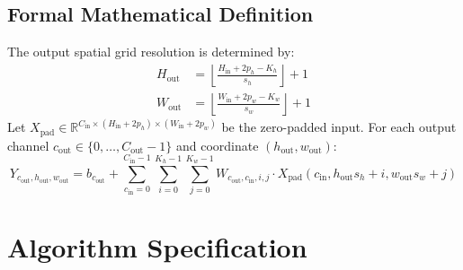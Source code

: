 \documentclass[11pt,a4paper]{article}
\theoremstyle{definition}
\begin{document}
\subsection{Formal Mathematical Definition}
The output spatial grid resolution is determined by:
\begin{align}
H_{\text{out}} &= \left\lfloor \frac{H_{\text{in}} + 2 p_h - K_h}{s_h} \right\rfloor + 1 \\
W_{\text{out}} &= \left\lfloor \frac{W_{\text{in}} + 2 p_w - K_w}{s_w} \right\rfloor + 1
\end{align}
Let $X_{\text{pad}} \in \mathbb{R}^{C_{\text{in}} \times (H_{\text{in}}+2p_h) \times (W_{\text{in}}+2p_w)}$ be the zero-padded input. For each output channel $c_{\text{out}} \in \{0, \dots, C_{\text{out}}-1\}$ and coordinate $(h_{\text{out}}, w_{\text{out}})$:
\begin{equation}
Y_{c_{\text{out}}, h_{\text{out}}, w_{\text{out}}} = b_{c_{\text{out}}} + \sum_{c_{\text{in}}=0}^{C_{\text{in}}-1} \sum_{i=0}^{K_h-1} \sum_{j=0}^{K_w-1} W_{c_{\text{out}}, c_{\text{in}}, i, j} \cdot X_{\text{pad}}(c_{\text{in}}, h_{\text{out}} s_h + i, w_{\text{out}} s_w + j)
\end{equation}

\section{Algorithm Specification}
\end{document}
